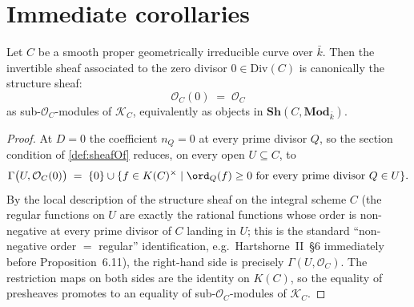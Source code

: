 \section{Immediate corollaries}

\begin{lemma}
  \label{lem:sheafOf_zero}

  Let \(C\) be a smooth proper geometrically irreducible curve over
  \(\bar k\). Then the invertible sheaf associated to the zero divisor
  \(0 \in \mathrm{Div}(C)\) is canonically the structure sheaf:
  \[
    \mathcal O_C(0) \;=\; \mathcal O_C
  \]
  as sub-\(\mathcal O_C\)-modules of \(\mathcal K_C\), equivalently as
  objects in \(\mathbf{Sh}(C, \mathbf{Mod}_{\bar k})\).
\end{lemma}

\begin{proof}
  
  At \(D = 0\) the coefficient \(n_Q = 0\) at every prime divisor \(Q\), so the
  section condition of \cref{def:sheafOf} reduces, on every open
  \(U \subseteq C\), to
  \[
    \Gamma\bigl(U, \mathcal O_C(0)\bigr)
    \;=\; \{ 0 \} \cup \{ f \in K(C)^{\times} \;|\;
      \ord_Q(f) \geq 0 \text{ for every prime divisor } Q \in U \}.
  \]
  By the local description of the structure sheaf on the integral
  scheme \(C\) (the regular functions on \(U\) are exactly the rational
  functions whose order is non-negative at every prime divisor of
  \(C\) landing in \(U\); this is the standard ``non-negative order \(=\)
  regular'' identification, e.g.\ Hartshorne~II~\S6 immediately before
  Proposition~6.11), the right-hand side is precisely
  \(\Gamma(U, \mathcal O_C)\). The restriction maps on both sides are
  the identity on \(K(C)\), so the equality of presheaves promotes to an
  equality of sub-\(\mathcal O_C\)-modules of \(\mathcal K_C\).
\end{proof}

